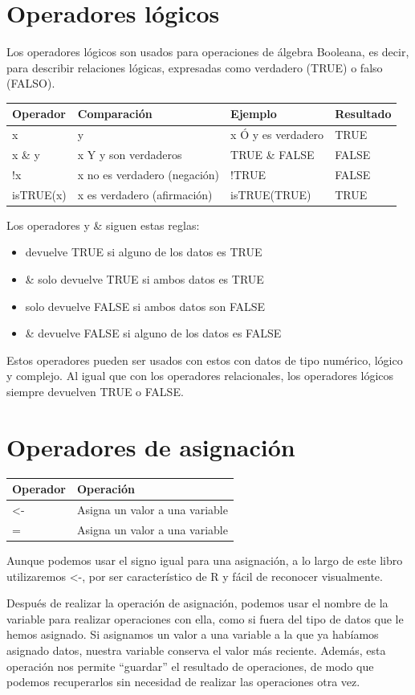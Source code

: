\documentclass[
]{book}
\begin{document}
\hypertarget{operadores-luxf3gicos}{%
\section{Operadores lógicos}\label{operadores-luxf3gicos}}

Los operadores lógicos son usados para operaciones de álgebra Booleana, es decir, para describir relaciones lógicas, expresadas como verdadero (TRUE) o falso (FALSO).

\begin{longtable}[]{@{}llll@{}}
\toprule
Operador & Comparación & Ejemplo & Resultado\tabularnewline
\midrule
\endhead
x & y & x Ó y es verdadero & TRUE\tabularnewline
x \& y & x Y y son verdaderos & TRUE \& FALSE & FALSE\tabularnewline
!x & x no es verdadero (negación) & !TRUE & FALSE\tabularnewline
isTRUE(x) & x es verdadero (afirmación) & isTRUE(TRUE) & TRUE\tabularnewline
\bottomrule
\end{longtable}

Los operadores \textbar{} y \& siguen estas reglas:

\begin{itemize}
\item
  devuelve TRUE si alguno de los datos es TRUE
\item
  \& solo devuelve TRUE si ambos datos es TRUE
\item
  solo devuelve FALSE si ambos datos son FALSE
\item
  \& devuelve FALSE si alguno de los datos es FALSE
\end{itemize}

Estos operadores pueden ser usados con estos con datos de tipo numérico, lógico y complejo. Al igual que con los operadores relacionales, los operadores lógicos siempre devuelven TRUE o FALSE.

\hypertarget{operadores-de-asignaciuxf3n}{%
\section{Operadores de asignación}\label{operadores-de-asignaciuxf3n}}

\begin{longtable}[]{@{}ll@{}}
\toprule
Operador & Operación\tabularnewline
\midrule
\endhead
\textless- & Asigna un valor a una variable\tabularnewline
= & Asigna un valor a una variable\tabularnewline
\bottomrule
\end{longtable}

Aunque podemos usar el signo igual para una asignación, a lo largo de este libro utilizaremos \textless-, por ser característico de R y fácil de reconocer visualmente.

Después de realizar la operación de asignación, podemos usar el nombre de la variable para realizar operaciones con ella, como si fuera del tipo de datos que le hemos asignado. Si asignamos un valor a una variable a la que ya habíamos asignado datos, nuestra variable conserva el valor más reciente. Además, esta operación nos permite ``guardar'' el resultado de operaciones, de modo que podemos recuperarlos sin necesidad de realizar las operaciones otra vez.

  
\end{document}
